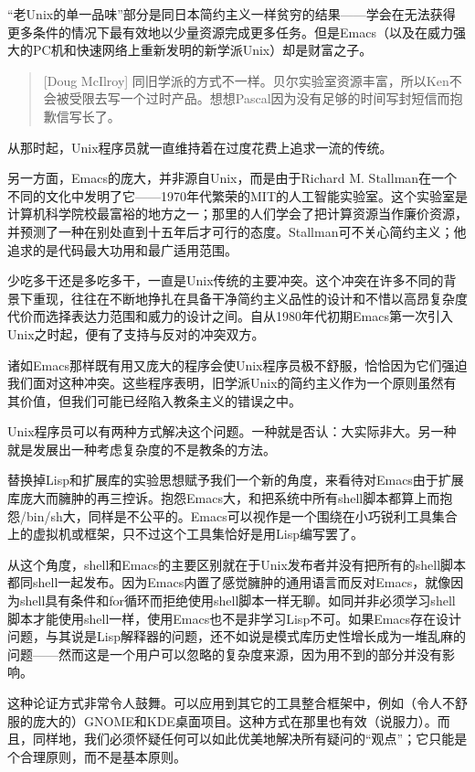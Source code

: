 \documentclass[12pt,oneside]{book}
\begin{document}
“老Unix的单一品味”部分是同日本简约主义一样贫穷的结果——学会在无法获得更多条件的情况下最有效地以少量资源完成更多任务。但是Emacs（以及在威力强大的PC机和快速网络上重新发明的新学派Unix）却是财富之子。

\begin{quote}[Doug McIlroy]
同旧学派的方式不一样。贝尔实验室资源丰富，所以Ken不会被受限去写一个过时产品。想想Pascal因为没有足够的时间写封短信而抱歉信写长了。
\end{quote}

从那时起，Unix程序员就一直维持着在过度花费上追求一流的传统。

另一方面，Emacs的庞大，并非源自Unix，而是由于Richard M. Stallman在一个不同的文化中发明了它——1970年代繁荣的MIT的人工智能实验室。这个实验室是计算机科学院校最富裕的地方之一；那里的人们学会了把计算资源当作廉价资源，并预测了一种在别处直到十五年后才可行的态度。Stallman可不关心简约主义；他追求的是代码最大功用和最广适用范围。

少吃多干还是多吃多干，一直是Unix传统的主要冲突。这个冲突在许多不同的背景下重现，往往在不断地挣扎在具备干净简约主义品性的设计和不惜以高昂复杂度代价而选择表达力范围和威力的设计之间。自从1980年代初期Emacs第一次引入Unix之时起，便有了支持与反对的冲突双方。

诸如Emacs那样既有用又庞大的程序会使Unix程序员极不舒服，恰恰因为它们强迫我们面对这种冲突。这些程序表明，旧学派Unix的简约主义作为一个原则虽然有其价值，但我们可能已经陷入教条主义的错误之中。

Unix程序员可以有两种方式解决这个问题。一种就是否认：大实际非大。另一种就是发展出一种考虑复杂度的不是教条的方法。

替换掉Lisp和扩展库的实验思想赋予我们一个新的角度，来看待对Emacs由于扩展库庞大而臃肿的再三控诉。抱怨Emacs大，和把系统中所有shell脚本都算上而抱怨/bin/sh大，同样是不公平的。Emacs可以视作是一个围绕在小巧锐利工具集合上的虚拟机或框架，只不过这个工具集恰好是用Lisp编写罢了。

从这个角度，shell和Emacs的主要区别就在于Unix发布者并没有把所有的shell脚本都同shell一起发布。因为Emacs内置了感觉臃肿的通用语言而反对Emacs，就像因为shell具有条件和for循环而拒绝使用shell脚本一样无聊。如同并非必须学习shell脚本才能使用shell一样，使用Emacs也不是非学习Lisp不可。如果Emacs存在设计问题，与其说是Lisp解释器的问题，还不如说是模式库历史性增长成为一堆乱麻的问题——然而这是一个用户可以忽略的复杂度来源，因为用不到的部分并没有影响。

这种论证方式非常令人鼓舞。可以应用到其它的工具整合框架中，例如（令人不舒服的庞大的）GNOME和KDE桌面项目。这种方式在那里也有效（说服力）。而且，同样地，我们必须怀疑任何可以如此优美地解决所有疑问的“观点”；它只能是个合理原则，而不是基本原则。
\end{document}
